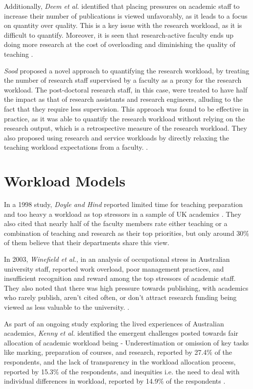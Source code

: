 Additionally, \textit{Deem et al.} identified that placing pressures on academic staff to increase their number of publications is viewed unfavorably, as it leads to a focus on quantity over quality. This is a key issue with the research workload, as it is difficult to quantify. Moreover, it is seen that research-active faculty ends up doing more research at the cost of overloading and diminishing the quality of teaching \cite{deem2020new}.

\textit{Sood} proposed a novel approach to quantifying the research workload, by treating the number of research staff supervised by a faculty as a proxy for the research workload. The post-doctoral research staff, in this case, were treated to have half the impact as that of research assistants and research engineers, alluding to the fact that they require less supervision. This approach was found to be effective in practice, as it was able to quantify the research workload without relying on the research output, which is a retrospective measure of the research workload. They also proposed using research and service workloads by directly relaxing the teaching workload expectations from a faculty. \cite{rohan2017}.

\section{Workload Models}

In a 1998 study, \textit{Doyle and Hind} reported limited time for teaching preparation and too heavy a workload as top stressors in a sample of UK academics \cite{doyle1998occupational}. They also cited that nearly half of the faculty members rate either teaching or a combination of teaching and research as their top priorities, but only around 30\% of them believe that their departments share this view.

In 2003, \textit{Winefield et al.}, in an analysis of occupational stress in Australian university staff, reported work overload, poor management practices, and insufficient recognition and reward among the top stressors of academic staff. They also noted that there was high pressure towards publishing, with academics who rarely publish, aren't cited often, or don't attract research funding being viewed as less valuable to the university. \cite{winefield2003occupational}.

As part of an ongoing study exploring the lived experiences of Australian academics, \textit{Kenny et al.} identified the emergent challenges posted towards fair allocation of academic workload being - Underestimation or omission of key tasks like marking, preparation of courses, and research, reported by 27.4\% of the respondents, and the lack of transparency in the workload allocation process, reported by 15.3\% of the respondents, and inequities i.e. the need to deal with individual differences in workload, reported by 14.9\% of the respondents \cite{kenny2021emerging}.

